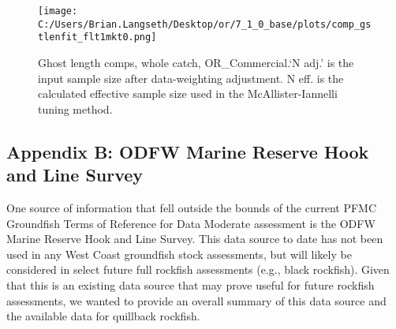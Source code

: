 \documentclass[11pt,
  english,
  a4paper,
]{article}
\begin{document}
\tagmcend\tagstructend


\begin{figure}
\centering
\texttt{[image: C:/Users/Brian.Langseth/Desktop/or/7\_1\_0\_base/plots/comp\_gstlenfit\_flt1mkt0.png]}
\caption{Ghost length comps, whole catch, OR\_Commercial.`N adj.' is the input sample size after data-weighting adjustment. N eff. is the calculated effective sample size used in the McAllister-Iannelli tuning method.\label{fig:comp_gstlenfit_flt1mkt0}}
\end{figure}

\tagmcend\tagstructend

\clearpage


\hypertarget{appendix-b-odfw-marine-reserve-hook-and-line-survey}{%
\subsection{Appendix B: ODFW Marine Reserve Hook and Line Survey}\label{appendix-b-odfw-marine-reserve-hook-and-line-survey}}

\leavevmode\tagmcend\tagstructend


One source of information that fell outside the bounds of the current PFMC Groundfish Terms of Reference for Data Moderate assessment is the ODFW Marine Reserve Hook and Line Survey. This data source to date has not been used in any West Coast groundfish stock assessments, but will likely be considered in select future full rockfish assessments (e.g., black rockfish). Given that this is an existing data source that may prove useful for future rockfish assessments, we wanted to provide an overall summary of this data source and the available data for quillback rockfish.

\leavevmode\tagmcend\tagstructend\par

\end{document}

